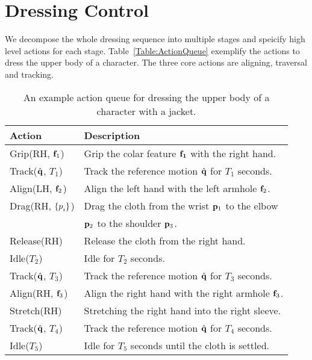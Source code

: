 \section{Dressing Control}

We decompose the whole dressing sequence into multiple stages and speicify high level actions for each stage. Table~\ref{Table:ActionQueue} exemplify the actions to dress the upper body of a character. The three core actions are aligning, traversal and tracking.

\begin{table}
  \centering
  \begin{tabular}{|l|l|}
    \hline
    Action & Description \\
    \hline
    Grip(RH, $\mathbf{f}_{1}$) & Grip the colar feature $\mathbf{f_1}$  with the right hand.\\
    Track($\hat{\mathbf{q}}$, $T_1$) & Track the reference motion $\hat{\mathbf{q}}$ for $T_1$ seconds.\\
    Align(LH, $\mathbf{f}_{2}$) & Align the left hand with the left armhole $\mathbf{f}_2$.\\
    Drag(RH, ${\mathbf{\{}p}_i\}$) & Drag the cloth from the wrist $\mathbf{p}_1$ to the elbow\\
    &                          $\mathbf{p}_2$ to the shoulder $\mathbf{p}_3$.\\
    Release(RH) & Release the cloth from the right hand.\\
    Idle($T_2$) & Idle for $T_2$ seconds.\\
    Track($\hat{\mathbf{q}}$, $T_3$) & Track the reference motion $\hat{\mathbf{q}}$ for $T_3$ seconds.\\
    Align(RH, $\mathbf{f}_{3}$) & Align the right hand with the right armhole $\mathbf{f}_3$.\\
    Stretch(RH) & Stretching the right hand into the right sleeve.\\
    Track($\hat{\mathbf{q}}$, $T_4$) & Track the reference motion $\hat{\mathbf{q}}$ for $T_4$ seconds. \\
    Idle($T_5$) & Idle for $T_5$ seconds until the cloth is settled.\\
    \hline
  \end{tabular}
  \caption{An example action queue for dressing the upper body of a character with a jacket.}
\end{table}


